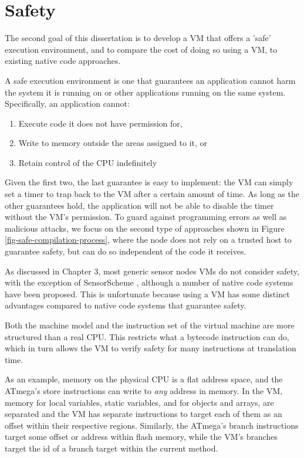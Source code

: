 \chapter{Safety}
\label{sec-safety}


The second goal of this dissertation is to develop a VM that offers a 'safe' execution environment, and to compare the cost of doing so using a VM, to existing native code approaches.

A safe execution environment is one that guarantees an application cannot harm the system it is running on or other applications running on the same system. Specifically, an application cannot:
\begin{enumerate}
    \item Execute code it does not have permission for,
    \item Write to memory outside the areas assigned to it, or
    \item Retain control of the CPU indefinitely
\end{enumerate}

Given the first two, the last guarantee is easy to implement: the VM can simply set a timer to trap back to the VM after a certain amount of time. As long as the other guarantees hold, the application will not be able to disable the timer without the VM's permission. To guard against programming errors as well as malicious attacks, we focus on the second type of approaches shown in Figure \ref{fig-safe-compilation-process}, where the node does not rely on a trusted host to guarantee safety, but can do so independent of the code it receives.

As discussed in Chapter 3, most generic sensor nodes VMs do not consider safety, with the exception of SensorScheme \cite{Evers:2010ur}, although a number of native code systems have been proposed. This is unfortunate because using a VM has some distinct advantages compared to native code systems that guarantee safety.

Both the machine model and the instruction set of the virtual machine are more structured than a real CPU. This restricts what a bytecode instruction can do, which in turn allows the VM to verify safety for many instructions at translation time.

As an example, memory on the physical CPU is a flat address space, and the ATmega's store instructions can write to \emph{any} address in memory. In the VM, memory for local variables, static variables, and for objects and arrays, are separated and the VM has separate instructions to target each of them as an offset within their respective regions. Similarly, the ATmega's branch instructions target some offset or address within flash memory, while the VM's branches target the id of a branch target within the current method.

